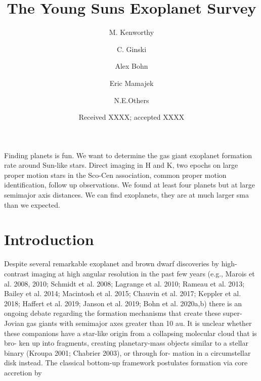 \documentclass[onecolumn]{aa} %
\begin{document}
 

   \title{The Young Suns Exoplanet Survey}

   \author{M. Kenworthy
          \and
          C. Ginski
          \and
          Alex Bohn 
          \and
          Eric Mamajek
          \and 
          N.E.Others
          }


   \date{Received XXXX; accepted XXXX}

 
  \abstract
   {Finding planets is fun.}
   {We want to determine the gas giant exoplanet formation rate around Sun-like stars.}
   {Direct imaging in H and K, two epochs on large proper motion stars in the Sco-Cen association, common proper motion identification, follow up observations.}
   {We found at least four planets but at large semimajor axis distances. }
   {We can find exoplanets, they are at much larger sma than we expected.}


   \maketitle
%

\section{Introduction}

Despite several remarkable exoplanet and brown dwarf discoveries by high-contrast imaging at high angular resolution in the past few years (e.g., Marois et al. 2008, 2010; Schmidt et al. 2008; Lagrange et al. 2010; Rameau et al. 2013; Bailey et al. 2014; Macintosh et al. 2015; Chauvin et al. 2017; Keppler et al. 2018; Haffert et al. 2019; Janson et al. 2019; Bohn et al. 2020a,b)
there is an ongoing debate regarding the formation mechanisms that create these super-Jovian gas giants with semimajor axes greater than 10 au. It is unclear whether these companions have a star-like origin from a collapsing molecular cloud that is bro- ken up into fragments, creating planetary-mass objects similar to a stellar binary (Kroupa 2001; Chabrier 2003), or through for- mation in a circumstellar disk instead. The classical bottom-up framework postulates formation via core accretion by
\end{document}
